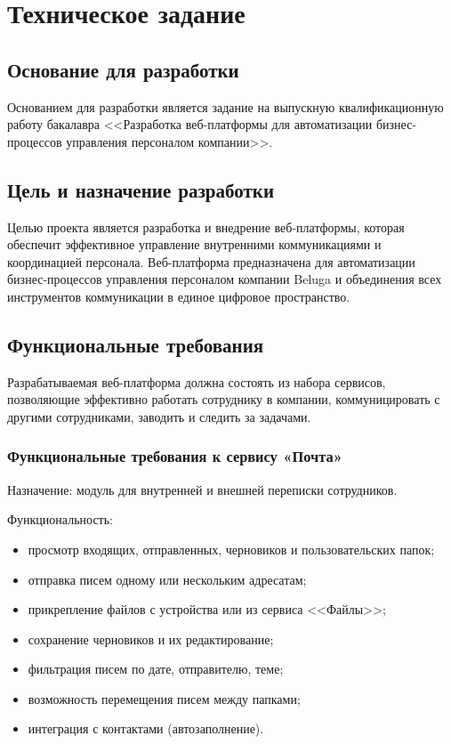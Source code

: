 \section{Техническое задание}

\subsection{Основание для разработки}

Основанием для разработки является задание на выпускную квалификационную работу бакалавра <<Разработка веб-платформы для автоматизации бизнес-процессов управления персоналом компании>>.

\subsection{Цель и назначение разработки}

Целью проекта является разработка и внедрение веб-платформы, которая обеспечит эффективное управление внутренними коммуникациями и координацией персонала. Веб-платформа предназначена для автоматизации бизнес-процессов управления персоналом компании Beluga и объединения всех инструментов коммуникации в единое цифровое пространство.

\subsection{Функциональные требования}

Разрабатываемая веб-платформа должна состоять из набора сервисов, позволяющие эффективно работать сотруднику в компании, коммуницировать с другими сотрудниками, заводить и следить за задачами.

\subsubsection{Функциональные требования к сервису «Почта»}

Назначение: модуль для внутренней и внешней переписки сотрудников.

Функциональность:
\begin{itemize}
  \item просмотр входящих, отправленных, черновиков и пользовательских папок;
  \item отправка писем одному или нескольким адресатам;
  \item прикрепление файлов с устройства или из сервиса <<Файлы>>;
  \item сохранение черновиков и их редактирование;
  \item фильтрация писем по дате, отправителю, теме;
  \item возможность перемещения писем между папками;
  \item интеграция с контактами (автозаполнение).
\end{itemize}

